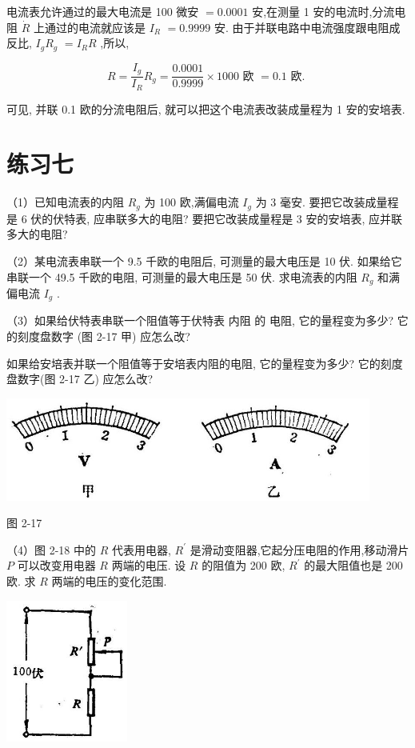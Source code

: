 \documentclass[10pt]{article}
\begin{document}
电流表允许通过的最大电流是 100 微安 \(= {0.0001}\) 安,在测量 1 安的电流时,分流电阻 \(\dot{R}\) 上通过的电流就应该是 \({I}_{R}\) \(= {0.9999}\) 安. 由于并联电路中电流强度跟电阻成反比, \({I}_{g}{R}_{g}\) \(= {I}_{R}R\) ,所以,

\[
R = \frac{{I}_{g}}{{I}_{R}}{R}_{g} = \frac{0.0001}{0.9999} \times {1000}\text{ 欧 } = {0.1}\text{ 欧. }
\]

可见, 并联 0.1 欧的分流电阻后, 就可以把这个电流表改装成量程为 1 安的安培表.

\section*{练习七}

（1）已知电流表的内阻 \({R}_{g}\) 为 100 欧,满偏电流 \({I}_{g}\) 为 3 毫安. 要把它改装成量程是 6 伏的伏特表, 应串联多大的电阻? 要把它改装成量程是 3 安的安培表, 应并联多大的电阻?

（2）某电流表串联一个 9.5 千欧的电阻后, 可测量的最大电压是 10 伏. 如果给它串联一个 49.5 千欧的电阻, 可测量的最大电压是 50 伏. 求电流表的内阻 \({R}_{g}\) 和满偏电流 \({I}_{g}\) .

（3）如果给伏特表串联一个阻值等于伏特表 内阻 的 电阻, 它的量程变为多少? 它的刻度盘数字 (图 2-17 甲) 应怎么改?

如果给安培表并联一个阻值等于安培表内阻的电阻, 它的量程变为多少? 它的刻度盘数字(图 2-17 乙) 应怎么改?

\begin{center}
\includegraphics[max width=0.9\textwidth]{images/01913056-1f15-74d8-9184-9aab52c9d66b_84_503760.jpg}
\end{center}

图 2-17

（4）图 2-18 中的 \(R\) 代表用电器, \({R}^{\prime }\) 是滑动变阻器,它起分压电阻的作用,移动滑片 \(P\) 可以改变用电器 \(R\) 两端的电压. 设 \(R\) 的阻值为 200 欧, \({R}^{\prime }\) 的最大阻值也是 200 欧. 求 \(R\) 两端的电压的变化范围.

\begin{center}
\includegraphics[max width=0.3\textwidth]{images/01913056-1f15-74d8-9184-9aab52c9d66b_84_568788.jpg}
\end{center}
\end{document}
